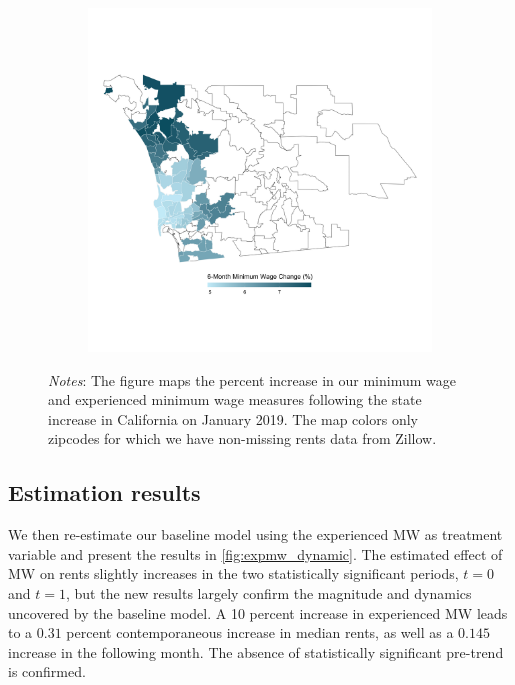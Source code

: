 \begin{figure}
\begin{subfigure}[b]{0.55\textwidth}
		\includegraphics[width = \textwidth]
		{../../analysis/descriptive_maps/output/San_Diego_expmw_msa.png}
	\end{subfigure}
	\begin{minipage}{0.95\textwidth} \footnotesize
		\vspace{2mm} 
		\textit{Notes}: The figure maps the percent increase in our minimum wage and 
		experienced minimum wage measures following the state increase in California
		on January 2019. The map colors only zipcodes for which we have non-missing 
		rents data from Zillow.
	\end{minipage}
\end{figure}


\subsection{Estimation results}

We then re-estimate our baseline model using the experienced MW as treatment variable and present the results in \autoref{fig:expmw_dynamic}. The estimated effect of MW on rents slightly increases in the two statistically significant periods,  $t=0$ and $t=1$, but the new results largely confirm the magnitude and dynamics uncovered by the baseline model. A 10 percent increase in experienced MW leads to a $0.31$ percent contemporaneous increase in median rents, as well as a $0.145$ increase in the following month. The absence of statistically significant pre-trend is confirmed.    

